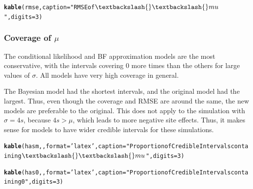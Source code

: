 \documentclass[AMA,STIX1COL]{WileyNJD-v2}\usepackage[]{graphicx}\usepackage[]{color}
\makeatletter
\newcommand{\hlnum}[1]{\textcolor[rgb]{0.686,0.059,0.569}{#1}}%
\newcommand{\hlstr}[1]{\textcolor[rgb]{0.192,0.494,0.8}{#1}}%
\newcommand{\hlstd}[1]{\textcolor[rgb]{0.345,0.345,0.345}{#1}}%
\newcommand{\hlkwc}[1]{\textcolor[rgb]{0.333,0.667,0.333}{#1}}%
\newcommand{\hlkwd}[1]{\textcolor[rgb]{0.737,0.353,0.396}{\textbf{#1}}}%
\newenvironment{kframe}{%
 \def\at@end@of@kframe{}%
 \ifinner\ifhmode%
  \def\at@end@of@kframe{\end{minipage}}%
  \begin{minipage}{\columnwidth}%
 \fi\fi%
 \def\FrameCommand##1{\hskip\@totalleftmargin \hskip-\fboxsep
 \colorbox{shadecolor}{##1}\hskip-\fboxsep
     \hskip-\linewidth \hskip-\@totalleftmargin \hskip\columnwidth}%
 \MakeFramed {\advance\hsize-\width
   \@totalleftmargin\z@ \linewidth\hsize
   \@setminipage}}%
 {\par\unskip\endMakeFramed%
 \at@end@of@kframe}
\newenvironment{knitrout}{}{} %
\makeatother
\begin{document}
\begin{knitrout}
\color{fgcolor}\begin{kframe}
\begin{alltt}
\hlkwd{kable}\hlstd{(rmse,} \hlkwc{caption}\hlstd{=}\hlstr{"RMSE of $\textbackslash{}\textbackslash{}mu$"}\hlstd{,}\hlkwc{digits}\hlstd{=}\hlnum{3}\hlstd{)}
\end{alltt}
\end{kframe}
\end{knitrout}


\begin{figure}

\end{figure}

\subsubsection{Coverage of $\mu$}

The conditional likelihood and BF approximation models are the most conservative, with the intervals covering 0 more times than the  others for large values of $\sigma$. All models have very high coverage in general.

The Bayesian model had the shortest intervals, and the original model had the largest. Thus, even though the coverage and RMSE are around the same, the new models are preferable to the original. This does not apply to the simulation with $\sigma=4s$, because $4s>\mu$, which leads to more negative site effects. Thus, it makes sense for models to have wider credible intervals for these simulations. 


\begin{knitrout}
\color{fgcolor}\begin{kframe}
\begin{alltt}
\hlkwd{kable}\hlstd{(hasm, ,}\hlkwc{format}\hlstd{=}\hlstr{'latex'}\hlstd{,}\hlkwc{caption}\hlstd{=}\hlstr{"Proportion of Credible Intervals containing $\textbackslash{}\textbackslash{}mu$"}\hlstd{,} \hlkwc{digits}\hlstd{=}\hlnum{3}\hlstd{)}
\end{alltt}
\end{kframe}
\end{knitrout}

\begin{knitrout}
\color{fgcolor}\begin{kframe}
\begin{alltt}
\hlkwd{kable}\hlstd{(has0, ,}\hlkwc{format}\hlstd{=}\hlstr{'latex'}\hlstd{,}\hlkwc{caption}\hlstd{=}\hlstr{"Proportion of Credible Intervals containing 0"}\hlstd{,} \hlkwc{digits}\hlstd{=}\hlnum{3}\hlstd{)}
\end{alltt}
\end{kframe}
\end{knitrout}
\end{document}
